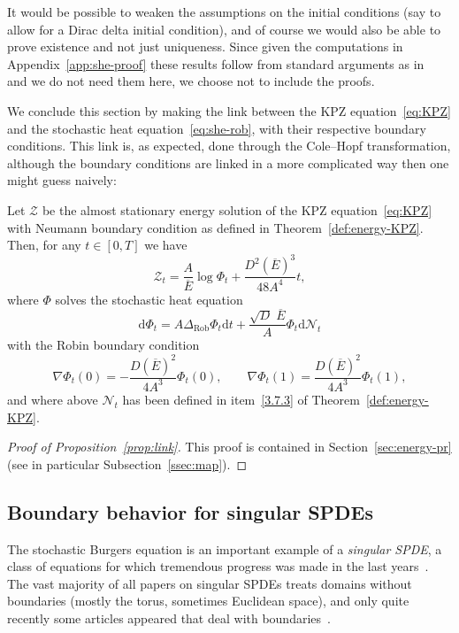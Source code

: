 \documentclass[AHL,Unicode,longabstracts]{cedram}
\newcommand{\mc}[1]{{\mathcal #1}}
\renewcommand{\mc}[1]{{\mathcal #1}}
\renewcommand{\bar}{\overline}
\newcommand*{\dd}{\mathrm{d}}
\newcommand*{\dt}{\dd t}
\begin{document}
\begin{rema}
It would be possible to weaken the assumptions on the initial conditions (say to allow for a Dirac delta initial condition), and of course we would also be able to prove existence and not just uniqueness. Since given the computations in Appendix~\ref{app:she-proof} these results follow from standard arguments as in~\cite{Quastel2011,Walsh1986} and we do not need them here, we choose not to include the proofs.
\end{rema}


We conclude this section by making the link between the KPZ equation~\eqref{eq:KPZ} and the stochastic heat equation~\eqref{eq:she-rob}, with their respective boundary conditions. This link is, as expected, done through the Cole--Hopf transformation, although the boundary conditions are linked in a more complicated way then one might guess naively:

\begin{prop}\label{prop:link}
Let $\mc Z$ be the almost stationary energy solution of the KPZ equation~\eqref{eq:KPZ} with Neumann boundary condition as defined in Theorem~\ref{def:energy-KPZ}. Then, for any $t\in [0,T]$ we have
\[
\mc Z_t = \frac{A}{\bar{E}} \log \Phi_t + \frac{D^2(\bar{E})^3}{48 A^4}t,
\]
where $\Phi$ solves the stochastic heat equation
\[
\dd \Phi_t = A \Delta_{\mathrm{Rob}} \Phi_t \dt + \frac{\sqrt{D}\; \bar{E}}{A} \Phi_t \dd\mc N_t
\]
with the Robin boundary condition
\[
\nabla \Phi_t(0) = - \frac{D(\bar{E})^2}{4A^3} \Phi_t(0), \qquad \nabla \Phi_t(1) = \frac{D(\bar{E})^2}{4A^3} \Phi_t(1),
\]
and where above $\mc N_t$ has been defined in item~\eqref{3.7.3} of Theorem~\ref{def:energy-KPZ}.
\end{prop}

\begin{proof}[Proof of Proposition~\ref{prop:link}]
This proof is contained in Section~\ref{sec:energy-pr} (see in particular Subsection~\ref{ssec:map}).
\end{proof}

\subsection{Boundary behavior for singular SPDEs} \label{ssec:boundary}

The stochastic Burgers equation is an important example of a \emph{singular SPDE}, a class of equations for which tremendous progress was made in the last years~\cite{Hairer2014, Gubinelli2015Paracontrolled}. The vast majority of all papers on singular SPDEs treats domains without boundaries (mostly the torus, sometimes Euclidean space), and only quite recently some articles appeared that deal with boundaries~\cite{Corwin2016, Gerencser2018}.
\end{document}
